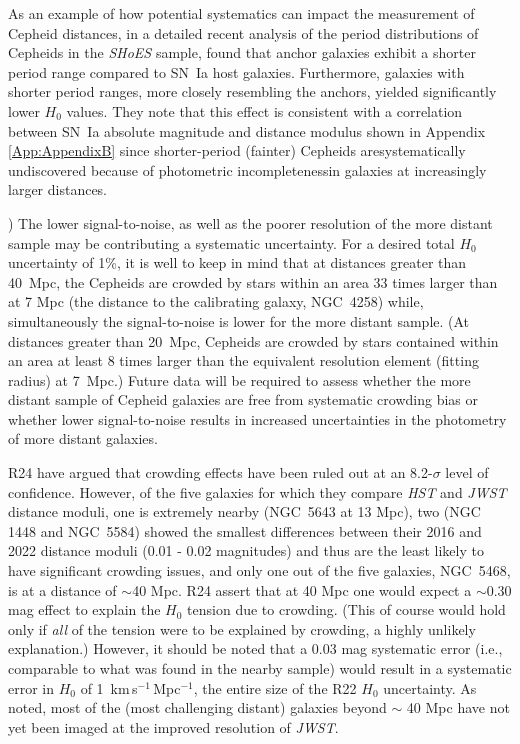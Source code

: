 \documentclass[12pt,modern]{aastex631}
\newcommand{\ho}{$H_{0}$\xspace}
\newcommand{\hounits}{\,km\,s$^{-1}$\,Mpc$^{-1}$\xspace}
\newcommand{\hst}{\emph{HST}\xspace}
\newcommand{\jwst}{\emph{JWST}\xspace}
\newcommand{\sn}{SN~Ia\xspace}
\newcommand{\shoes}{\emph{SHoES}\xspace}
\newcommand{\ngc}{NGC\,\xspace}
\begin{document}
{As an example of how potential systematics can impact the measurement of Cepheid distances, in a detailed recent analysis of the period distributions of Cepheids in the \shoes sample, \citet{hogras_mortsell_2024} found that anchor galaxies exhibit a shorter period range compared to \sn host galaxies. Furthermore, galaxies with shorter period ranges, more closely resembling the anchors, yielded significantly lower \ho values. They note that this effect is consistent with a correlation between \sn absolute magnitude and distance modulus shown  in Appendix \ref{App:AppendixB} since shorter-period (fainter) Cepheids aresystematically undiscovered because of photometric incompletenessin galaxies at increasingly larger distances. 


) The lower signal-to-noise, as well as the poorer resolution of the more distant sample may be contributing a systematic uncertainty.  For a desired total \ho uncertainty of 1\%, it is well to keep in mind that at distances greater than 40~Mpc, the Cepheids are crowded by stars within an area 33 times larger than at 7  Mpc (the distance to the calibrating galaxy, \ngc 4258) while, simultaneously the signal-to-noise is lower for the more distant sample. (At distances greater than 20~Mpc, Cepheids are crowded by stars contained within an area at least 8 times larger than the equivalent resolution element (fitting radius) at 7~Mpc.)  Future data will be required to assess  whether the more distant sample of Cepheid galaxies are free from systematic crowding bias or whether lower signal-to-noise results in increased uncertainties in the photometry of more distant galaxies. 

R24   have argued that crowding effects have been ruled out at an 8.2-$\sigma$ level of confidence. However, of the five galaxies for which they compare \hst and \jwst distance moduli, one  is extremely nearby (\ngc 5643 at 13 Mpc), two  (\ngc 1448 and \ngc 5584) showed the smallest differences between their 2016 and 2022 distance moduli (0.01 - 0.02 magnitudes) and thus are the least likely to have significant crowding issues,  and only one out of the five galaxies,  \ngc 5468, is at a distance of $\sim$40 Mpc. R24 assert that at 40 Mpc one would expect a $\sim$0.30 mag effect to explain the \ho tension due to crowding. (This of course would hold only if {\it all} of the tension were to be explained by crowding, a highly unlikely explanation.) However, it should be noted that a 0.03 mag systematic error (i.e., comparable to what was found in the nearby sample) would result in a systematic error in \ho of 1 \hounits, the entire size of the R22 \ho uncertainty. As noted, most of the (most challenging distant) galaxies beyond $\sim$ 40 Mpc have not yet been imaged at the improved resolution of  \jwst. 



}
\end{document}
